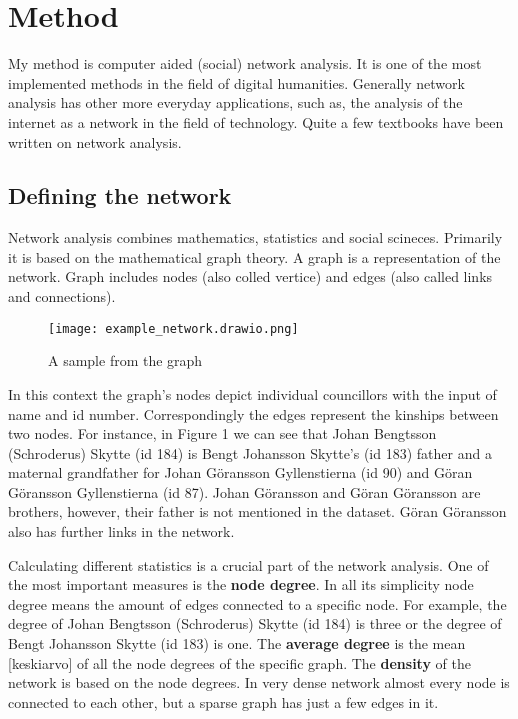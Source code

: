 \section{Method}
\label{method}
My method is computer aided (social) network analysis. It is one of the most implemented methods in the field of digital humanities. Generally network analysis has other more everyday applications, such as, the analysis of the internet as a network in the field of technology. Quite a few textbooks have been written on network analysis.


\subsection{Defining the network}
Network analysis combines mathematics, statistics and social scineces. Primarily it is based on the mathematical graph theory. A graph is a representation of the network. Graph includes nodes (also colled vertice) and edges (also called links and connections).

\begin{figure}[h]
	\texttt{[image: example\_network.drawio.png]}
	\centering
	\caption{A sample from the graph} 
	\centering
\end{figure}
In this context the graph's nodes depict individual councillors with the input of name and id number. Correspondingly the edges represent the kinships between two nodes. For instance, in Figure 1 we can see that Johan Bengtsson (Schroderus) Skytte (id 184) is Bengt Johansson Skytte's (id 183) father and a maternal grandfather for Johan Göransson Gyllenstierna (id 90) and Göran Göransson Gyllenstierna (id 87). Johan Göransson and Göran Göransson are brothers, however, their father is not mentioned in the dataset. Göran Göransson also has further links in the network. 

Calculating different statistics is a crucial part of the network analysis. One of the most important measures is the \textbf{node degree}. In all its simplicity node degree means the amount of edges connected to a specific node. For example, the degree of Johan Bengtsson (Schroderus) Skytte (id 184) is three or the degree of Bengt Johansson Skytte (id 183) is one. The \textbf{average degree} is the mean [keskiarvo] of all the node degrees of the specific graph. The \textbf{density} of the network is based on the node degrees. In very dense network almost every node is connected to each other, but a sparse graph has just a few edges in it.


